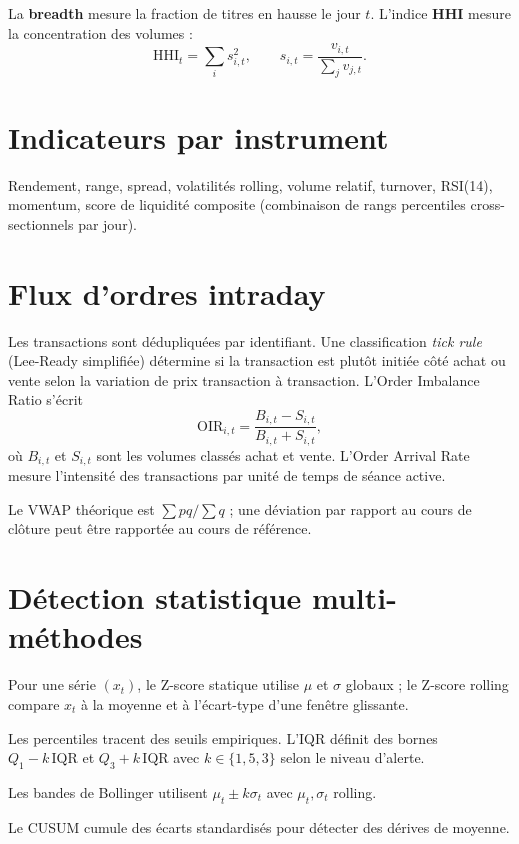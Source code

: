 \documentclass[a4paper,12pt,twoside,openright]{report}
\begin{document}
La \textbf{breadth} mesure la fraction de titres en hausse le jour $t$. L'indice \textbf{HHI} mesure la concentration des volumes :
\begin{equation}
\mathrm{HHI}_t=\sum_i s_{i,t}^2, \qquad s_{i,t}=\frac{v_{i,t}}{\sum_j v_{j,t}} .
\end{equation}

\section{Indicateurs par instrument}
Rendement, range, spread, volatilités rolling, volume relatif, turnover, RSI(14), momentum, score de liquidité composite (combinaison de rangs percentiles cross-sectionnels par jour).

\section{Flux d'ordres intraday}
Les transactions sont dédupliquées par identifiant. Une classification \emph{tick rule} (Lee-Ready simplifiée) détermine si la transaction est plutôt initiée côté achat ou vente selon la variation de prix transaction à transaction. L'Order Imbalance Ratio s'écrit
\begin{equation}
\mathrm{OIR}_{i,t}=\frac{B_{i,t}-S_{i,t}}{B_{i,t}+S_{i,t}},
\end{equation}
où $B_{i,t}$ et $S_{i,t}$ sont les volumes classés achat et vente. L'Order Arrival Rate mesure l'intensité des transactions par unité de temps de séance active.

Le VWAP théorique est $\sum p q / \sum q$ ; une déviation par rapport au cours de clôture peut être rapportée au cours de référence.

\section{Détection statistique multi-méthodes}
Pour une série $(x_t)$, le Z-score statique utilise $\mu$ et $\sigma$ globaux ; le Z-score rolling compare $x_t$ à la moyenne et à l'écart-type d'une fenêtre glissante.

Les percentiles tracent des seuils empiriques. L'IQR définit des bornes $Q_1-k\,\mathrm{IQR}$ et $Q_3+k\,\mathrm{IQR}$ avec $k\in\{1{,}5,3\}$ selon le niveau d'alerte.

Les bandes de Bollinger utilisent $\mu_t\pm k\sigma_t$ avec $\mu_t,\sigma_t$ rolling.

Le CUSUM cumule des écarts standardisés pour détecter des dérives de moyenne.
\end{document}
